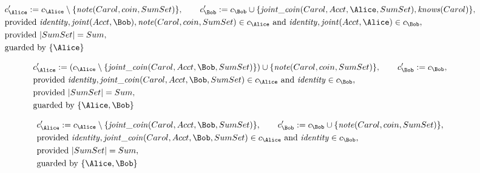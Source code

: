 \begin{align*}
&
c'_
{
\Alice
}
 := 
c_
{
\Alice
}
 \setminus 
\{
\mathit{\detokenize{
note
}}
(
Carol
,
coin
,
SumSet
)
\}
, \qquad 
c'_
{
\Bob
}
 := 
c_
{
\Bob
}
 \cup 
\{
\mathit{\detokenize{
joint_coin
}}
(
Carol
,
Acct
,
\Alice
,
SumSet
)
,
\mathit{\detokenize{
knows
}}
(
Carol
)
\}
,\\
&
\text{provided } 
\mathit{\detokenize{
identity
}}
,
\mathit{\detokenize{
joint
}}
(
Acct
,
\Bob
)
,
\mathit{\detokenize{
note
}}
(
Carol
,
coin
,
SumSet
)
 \in c_
{
\Alice
}
 \text{ and } 
\mathit{\detokenize{
identity
}}
,
\mathit{\detokenize{
joint
}}
(
Acct
,
\Alice
)
 \in c_
{
\Bob
}
,\\
&
\text{provided } 
|
SumSet
|
=
Sum
,\\
&
\text{guarded by } \{
\Alice
\}
\end{align*}

\begin{align*}
&
c'_
{
\Alice
}
 := 
(c_
{
\Alice
}
 \setminus 
\{
\mathit{\detokenize{
joint_coin
}}
(
Carol
,
Acct
,
\Bob
,
SumSet
)
\}
) \cup 
\{
\mathit{\detokenize{
note
}}
(
Carol
,
coin
,
SumSet
)
\}
, \qquad 
c'_
{
\Bob
}
 := 
c_
{
\Bob
}
,\\
&
\text{provided } 
\mathit{\detokenize{
identity
}}
,
\mathit{\detokenize{
joint_coin
}}
(
Carol
,
Acct
,
\Bob
,
SumSet
)
 \in c_
{
\Alice
}
 \text{ and } 
\mathit{\detokenize{
identity
}}
 \in c_
{
\Bob
}
,\\
&
\text{provided } 
|
SumSet
|
=
Sum
,\\
&
\text{guarded by } \{
\Alice
,
\Bob
\}
\end{align*}

\begin{align*}
&
c'_
{
\Alice
}
 := 
c_
{
\Alice
}
 \setminus 
\{
\mathit{\detokenize{
joint_coin
}}
(
Carol
,
Acct
,
\Bob
,
SumSet
)
\}
, \qquad 
c'_
{
\Bob
}
 := 
c_
{
\Bob
}
 \cup 
\{
\mathit{\detokenize{
note
}}
(
Carol
,
coin
,
SumSet
)
\}
,\\
&
\text{provided } 
\mathit{\detokenize{
identity
}}
,
\mathit{\detokenize{
joint_coin
}}
(
Carol
,
Acct
,
\Bob
,
SumSet
)
 \in c_
{
\Alice
}
 \text{ and } 
\mathit{\detokenize{
identity
}}
 \in c_
{
\Bob
}
,\\
&
\text{provided } 
|
SumSet
|
=
Sum
,\\
&
\text{guarded by } \{
\Alice
,
\Bob
\}
\end{align*}
